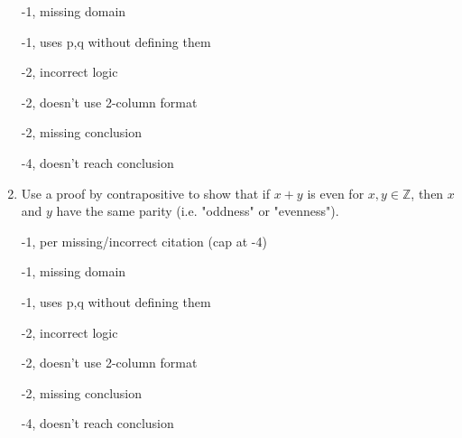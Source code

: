 \begin{enumerate}
\begin{rubric}
-1, missing domain

-1, uses p,q without defining them

-2, incorrect logic

-2, doesn't use 2-column format

-2, missing conclusion

-4, doesn't reach conclusion
\end{rubric}

\item Use a proof by contrapositive to show that if $x+y$ is even for $x,y \in \mathbb{Z}$, then $x$ and $y$ have the same parity (i.e. "oddness" or "evenness"). 

\begin{rubric}
-1, per missing/incorrect citation (cap at -4)

-1, missing domain

-1, uses p,q without defining them

-2, incorrect logic

-2, doesn't use 2-column format

-2, missing conclusion

-4, doesn't reach conclusion
\end{rubric}

\end{enumerate}